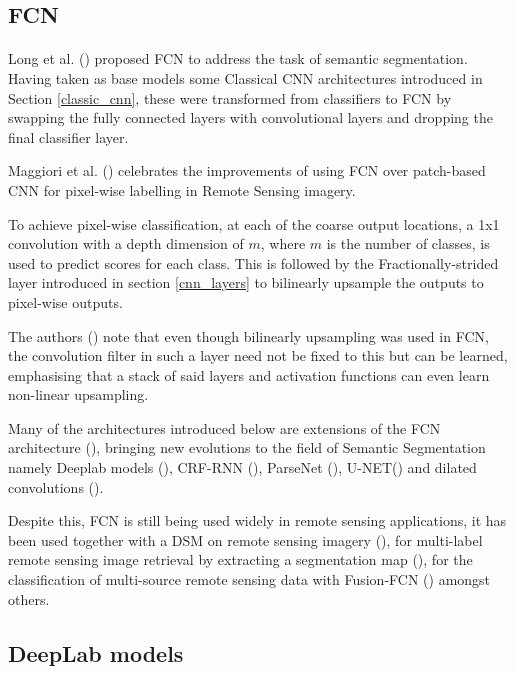 \subsection{\gls{FCN}} 
\paragraph{}
Long et al. (\cite{long2015fully}) proposed \gls{FCN} to address the task of semantic segmentation. Having taken as base models some Classical \gls{CNN} architectures introduced in Section \ref{classic_cnn}, these were transformed from classifiers to \gls{FCN} by swapping the fully connected layers with convolutional layers and dropping the final classifier layer. 

Maggiori et al. (\cite{7730322}) celebrates the improvements of using \gls{FCN} over patch-based \gls{CNN} for pixel-wise labelling in Remote Sensing imagery.

To achieve pixel-wise classification, at each of the coarse output locations, a 1x1 convolution with a depth dimension of $m$, where $m$ is the number of classes, is used to predict scores for each class. This is followed by the Fractionally-strided layer introduced in section \ref{cnn_layers} to bilinearly upsample the outputs to pixel-wise outputs. 

The authors (\cite{long2015fully}) note that even though bilinearly upsampling was used in \gls{FCN}, the convolution filter in such a layer need not be fixed to this but can be learned, emphasising that a stack of said layers and activation functions can even learn non-linear upsampling.

Many of the architectures introduced below are extensions of the \gls{FCN} architecture (\cite{long2015fully}), bringing new evolutions to the field of Semantic Segmentation namely Deeplab models (\cite{chen2017deeplab}), \gls{CRF}-\gls{RNN} (\cite{Zheng_2015}), ParseNet (\cite{liu2015parsenet}), U-NET(\cite{ronneberger2015unet}) and dilated convolutions (\cite{yu2016multiscale}).

Despite this, \gls{FCN} is still being used widely in remote sensing applications, it has been used together with a \gls{DSM} on remote sensing imagery (\cite{8281008}), for multi-label remote sensing image retrieval by extracting a segmentation map (\cite{8954885}), for the classification of multi-source remote sensing data with Fusion-\gls{FCN} (\cite{8518295}) amongst others.

\subsection{DeepLab models}
